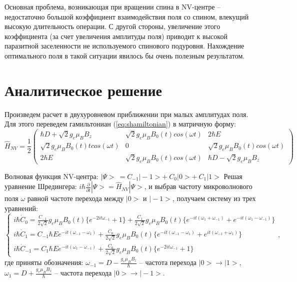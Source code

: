 \newpage
{}

Основная проблема, возникающая при вращении спина в NV-центре --
недостаточно большой коэффициент взаимодействия поля со спином,
влекущий высокую длительность операции. С другой стороны, увеличение
этого коэффициента (за счет увеличения амплитуды поля) приводит к
высокой паразитной заселенности не используемого спинового
подуровня. Нахождение оптимального поля в такой ситуации явилось бы
очень полезным результатом.
\section{Аналитическое решение}
Произведем расчет в двухуровневом приближении при малых
амплитудах поля. Для этого переведем гамильтониан
(\ref{eq:shamiltonian}) в матричную форму:
\[  \hat{H}_{NV} = \frac{1}{2} \left( 
  \begin{array}{ccc}
    \hbar D + \sqrt{2} g_e \mu_B B_z &
    \sqrt{2} g_e \mu_B B_0(t) cos(\omega t) & 
    2 \hbar E\\
    \sqrt{2} g_e \mu_B B_0(t)t cos(\omega t) & 
    0 & 
    \sqrt{2} g_e \mu_B B_0(t) cos(\omega t) \\
    2 \hbar E & 
    \sqrt{2} g_e \mu_B B_0(t) cos(\omega t) & 
    \hbar D - \sqrt{2} g_e \mu_B B_z
  \end{array} \right)
\]

Волновая функция NV-центра: $|\Psi\!>~= C_{-1}|\!-\!1\!> +~C_{0}|0\!> +~C_{1}|1\!>$
Решая уравнение Шредингера: $i \hbar
\frac{\partial}{\partial t}|\Psi> = \hat{H}_{NV}|\Psi>$, и выбрав
частоту микроволнового поля $\omega$ равной частоте перехода между $|0\!>$
и $|\!-\!1\!>$, получаем
систему из трех уравнений:
\begin{equation*}
\begin{cases} 
  i \hbar \dot{C}_{0} = \frac{C_{-1}}{2 \sqrt{2}} g_e \mu_B B_0(t)
  \{e^{-2it\omega_{-1}} + 1 \} + \frac{C_1}{2 \sqrt{2}} g_e \mu_B B_0(t)
  \{e^{-it(\omega_1 + \omega_{-1})} + e^{-it(\omega_1 - \omega_{-1})} \}\\ 
  i \hbar \dot{C}_1 = C_{-1} \hbar E e^{-it(\omega_{-1} - \omega_1)} + \frac{C_0}{2 \sqrt{2}} g_e \mu_B
  B_0(t) \{ e^{-it(\omega_{-1} - \omega_1)} + e^{it(\omega_{-1} + \omega_1)} \} \\ 
  i \hbar \dot{C}_{-1} = C_1 \hbar E e^{-it(\omega_1 - \omega_{-1})} +
  \frac{C_0}{2 \sqrt{2}} g_e \mu_B B_0(t) \{ e^{-2it\omega_{-1}} + 1 \} 
\end{cases},
\end{equation*}
где приняты обозначения: $\omega_{-1} = D - \frac{g_e \mu_B B_z}{\hbar}$ -- частота перехода $|0\!> \to |1\!>$,
$\omega_{1} = D + \frac{g_e \mu_B B_z}{\hbar}$ -- частота перехода $|0\!> \to |\!-\!1\!>$.

